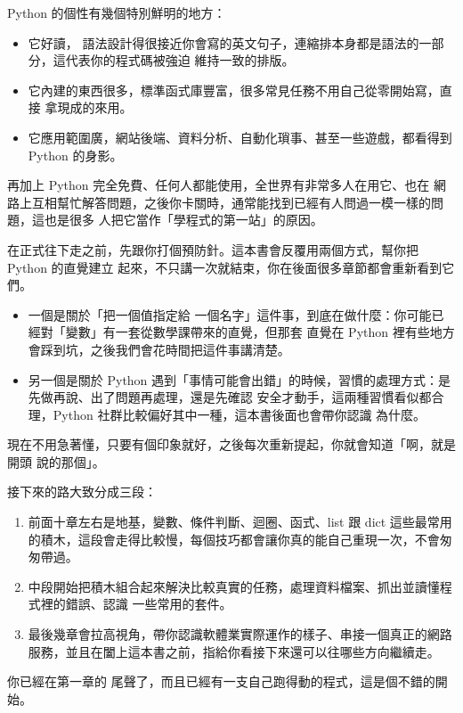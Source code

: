 Python 的個性有幾個特別鮮明的地方：

\begin{itemize}
\item 它好讀，
語法設計得很接近你會寫的英文句子，連縮排本身都是語法的一部分，這代表你的程式碼被強迫
維持一致的排版。
\item 它內建的東西很多，標準函式庫豐富，很多常見任務不用自己從零開始寫，直接
拿現成的來用。
\item 它應用範圍廣，網站後端、資料分析、自動化瑣事、甚至一些遊戲，都看得到
Python 的身影。
\end{itemize}

再加上 Python 完全免費、任何人都能使用，全世界有非常多人在用它、也在
網路上互相幫忙解答問題，之後你卡關時，通常能找到已經有人問過一模一樣的問題，這也是很多
人把它當作「學程式的第一站」的原因。

在正式往下走之前，先跟你打個預防針。這本書會反覆用兩個方式，幫你把 Python 的直覺建立
起來，不只講一次就結束，你在後面很多章節都會重新看到它們。

\begin{itemize}
\item 一個是關於「把一個值指定給
一個名字」這件事，到底在做什麼：你可能已經對「變數」有一套從數學課帶來的直覺，但那套
直覺在 Python 裡有些地方會踩到坑，之後我們會花時間把這件事講清楚。
\item 另一個是關於 Python
遇到「事情可能會出錯」的時候，習慣的處理方式：是先做再說、出了問題再處理，還是先確認
安全才動手，這兩種習慣看似都合理，Python 社群比較偏好其中一種，這本書後面也會帶你認識
為什麼。
\end{itemize}

現在不用急著懂，只要有個印象就好，之後每次重新提起，你就會知道「啊，就是開頭
說的那個」。

接下來的路大致分成三段：

\begin{enumerate}
\item 前面十章左右是地基，變數、條件判斷、迴圈、函式、list 跟 dict
這些最常用的積木，這段會走得比較慢，每個技巧都會讓你真的能自己重現一次，不會匆匆帶過。
\item 中段開始把積木組合起來解決比較真實的任務，處理資料檔案、抓出並讀懂程式裡的錯誤、認識
一些常用的套件。
\item 最後幾章會拉高視角，帶你認識軟體業實際運作的樣子、串接一個真正的網路
服務，並且在闔上這本書之前，指給你看接下來還可以往哪些方向繼續走。
\end{enumerate}

你已經在第一章的
尾聲了，而且已經有一支自己跑得動的程式，這是個不錯的開始。

